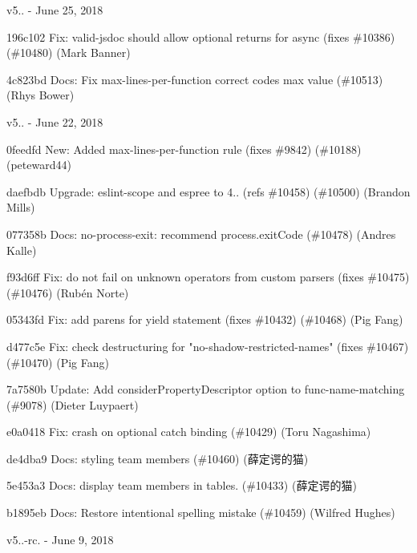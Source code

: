 v5.. -\/ June 25, 2018


\begin{DoxyItemize}
\item 196c102 Fix\+: valid-\/jsdoc should allow optional returns for async (fixes \#10386) (\#10480) (Mark Banner)
\item 4c823bd Docs\+: Fix max-\/lines-\/per-\/function correct code\textquotesingle{}s max value (\#10513) (Rhys Bower)
\end{DoxyItemize}

v5.. -\/ June 22, 2018


\begin{DoxyItemize}
\item 0feedfd New\+: Added max-\/lines-\/per-\/function rule (fixes \#9842) (\#10188) (peteward44)
\item daefbdb Upgrade\+: eslint-\/scope and espree to 4.. (refs \#10458) (\#10500) (Brandon Mills)
\item 077358b Docs\+: no-\/process-\/exit\+: recommend process.\+exit\+Code (\#10478) (Andres Kalle)
\item f93d6ff Fix\+: do not fail on unknown operators from custom parsers (fixes \#10475) (\#10476) (Rubén Norte)
\item 05343fd Fix\+: add parens for yield statement (fixes \#10432) (\#10468) (Pig Fang)
\item d477c5e Fix\+: check destructuring for "{}no-\/shadow-\/restricted-\/names"{} (fixes \#10467) (\#10470) (Pig Fang)
\item 7a7580b Update\+: Add consider\+Property\+Descriptor option to func-\/name-\/matching (\#9078) (Dieter Luypaert)
\item e0a0418 Fix\+: crash on optional catch binding (\#10429) (Toru Nagashima)
\item de4dba9 Docs\+: styling team members (\#10460) (薛定谔的猫)
\item 5e453a3 Docs\+: display team members in tables. (\#10433) (薛定谔的猫)
\item b1895eb Docs\+: Restore intentional spelling mistake (\#10459) (Wilfred Hughes)
\end{DoxyItemize}

v5..-\/rc. -\/ June 9, 2018



